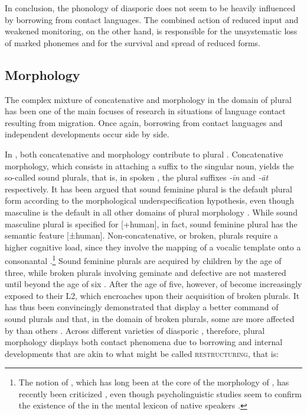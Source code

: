 \documentclass[output=paper]{langsci/langscibook}
\begin{document}
In conclusion, the phonology of diasporic  does not seem to be heavily influenced by borrowing from contact languages. The combined action of reduced input and weakened monitoring, on the other hand, is responsible for the unsystematic loss of marked phonemes and for the survival and spread of reduced forms.


 
 \subsection{Morphology}


The complex mixture of concatenative and  morphology in the domain of  plural  has been one of the main focuses of research in situations of language contact resulting from migration. Once again, borrowing from contact languages and independent developments occur side by side.

In , both concatenative and  morphology contribute to plural . Concatenative morphology, which consists in attaching a suffix to the singular noun, yields the so-called sound plurals, that is, in spoken , the plural suffixes \textit{{}-īn} and \textit{{}-āt} respectively. It has been argued that sound feminine plural is the default plural form according to the morphological underspecification hypothesis, even though masculine is the default  in all other domains of plural morphology \citep[855–856]{AlbiriniBenmamoun2014}. While sound masculine plural is specified for [+human], in fact, sound feminine plural has the semantic feature [±human]. Non-concatenative, or broken, plurals require a higher cognitive load, since they involve the mapping of a vocalic template onto a consonantal .\footnote{The notion of , which has long been at the core of the morphology of , has recently been criticized \citep{Ratcliffe2013}, even though psycholinguistic studies seem to confirm the existence of the  in the mental lexicon of native speakers \citep{Boudelaa2013}.} Sound feminine plurals are acquired by children by the age of three, while broken plurals involving geminate and defective  are not mastered until beyond the age of six \citep[857–858]{AlbiriniBenmamoun2014}.  After the age of five, however,  of  become increasingly exposed to their L2, which encroaches upon their acquisition of broken plurals. It has thus been convincingly demonstrated that  display a better command of sound plurals and that, in the domain of broken plurals, some are more affected by  than others \citep[858–859]{AlbiriniBenmamoun2014}. Across different varieties of diasporic , therefore, plural morphology displays both contact phenomena due to borrowing and internal developments that are akin to what might be called \textsc{restructuring}, that is:
\end{document}
